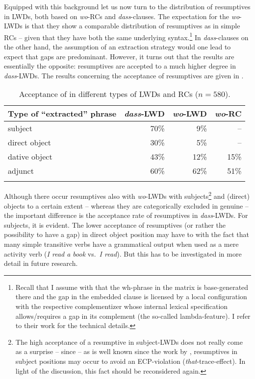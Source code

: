 \documentclass[output=paper]{langsci/langscibook}
\begin{document}
Equipped with this background let us now turn to the distribution of
resumptives in \glspl{LWD}, both based on \emph{wo}-\glspl{RC} and
\emph{dass}-clauses. The expectation for the \emph{wo}-\gls{LWD}s is that they
show a comparable distribution of resumptives as in simple \glspl{RC} -- given
that they have both the same underlying syntax.\footnote{Recall that I assume
    with \citet{AdgRam2005} that the wh-phrase in the matrix is base-generated
    there and the gap in the embedded clause is licensed by a local
    configuration with the respective complementizer whose internal lexical
    specification allows/requires a gap in its complement (the so-called
    lambda-feature). I refer to their work for the technical details.} In
    \emph{dass}-clauses on the other hand, the assumption of an extraction strategy
    would one lead to expect that gaps are predominant.  However, it turns out
    that the results are essentially the opposite: resumptives are accepted to
    a much higher degree in \emph{dass}-\glspl{LWD}. The results concerning the
    acceptance of resumptives are given in .

\begin{table}
\begin{tabular}{lrrr}
\lsptoprule
{Type of \enquote{extracted} phrase} & {\emph{dass}-LWD} & {\emph{wo}-LWD} & {\emph{wo}-RC}\\
\midrule
{subject}  & {70\%} & {9\%} & --\\
{direct object} & {30\%} & {5\%} & --\\
{dative object} & {43\%} & {12\%} & {15\%}\\
{adjunct}  & {60\%} & {62\%} & {51\%}\\
\lspbottomrule
\end{tabular}
\caption{Acceptance of  in different types of \glspl{LWD} and \glspl{RC}
($n = 580$).}\label{tab:36.1}
\end{table}

\largerpage
Although there occur resumptives also with \emph{wo}-\glspl{LWD} with
subjects\footnote{The high acceptance of a resumptive in subject-\glspl{LWD} does not
    really come as a surprise -- since -- as is well known since the work by
    \citet{Engdahl1985}, resumptives in subject positions may occur to avoid an
    \gls{ECP}-violation (\emph{that}-trace-effect). In light of the discussion, this fact should
be reconsidered again.}  and (direct) objects to a certain extent -- whereas
they are categorically excluded in genuine  -- the important
difference is the acceptance rate of resumptives in \emph{dass}-\glspl{LWD}. For
subjects, it is evident. The lower acceptance of resumptives (or rather the
possibility to have a gap) in direct object position may have to with the fact
that many simple transitive verbs have a grammatical output when used as a mere
activity verb (\emph{I read a book} vs.\ \emph{I read}). But this has to be investigated in more detail in future
research.
\end{document}
